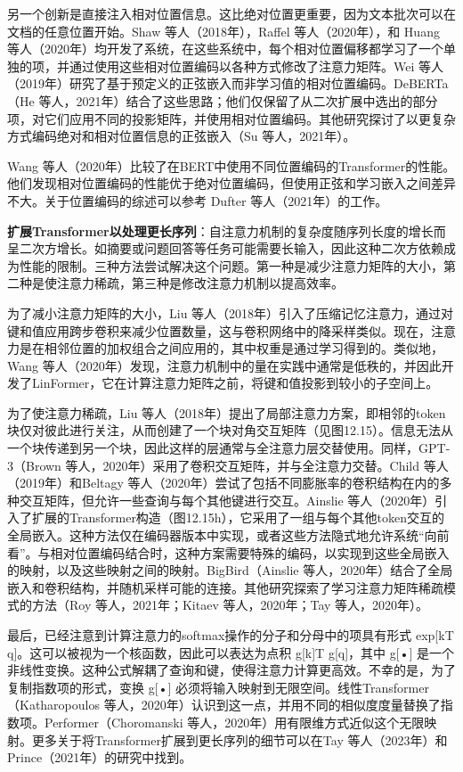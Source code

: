 \documentclass[lang=cn,newtx,10pt,scheme=chinese]{elegantbook}
\begin{document}
另一个创新是直接注入相对位置信息。这比绝对位置更重要，因为文本批次可以在文档的任意位置开始。Shaw 等人（2018年），Raffel 等人（2020年），和 Huang 等人（2020年）均开发了系统，在这些系统中，每个相对位置偏移都学习了一个单独的项，并通过使用这些相对位置编码以各种方式修改了注意力矩阵。Wei 等人（2019年）研究了基于预定义的正弦嵌入而非学习值的相对位置编码。DeBERTa（He 等人，2021年）结合了这些思路；他们仅保留了从二次扩展中选出的部分项，对它们应用不同的投影矩阵，并使用相对位置编码。其他研究探讨了以更复杂方式编码绝对和相对位置信息的正弦嵌入（Su 等人，2021年）。

Wang 等人（2020年）比较了在BERT中使用不同位置编码的Transformer的性能。他们发现相对位置编码的性能优于绝对位置编码，但使用正弦和学习嵌入之间差异不大。关于位置编码的综述可以参考 Dufter 等人（2021年）的工作。

\textbf{扩展Transformer以处理更长序列}：自注意力机制的复杂度随序列长度的增长而呈二次方增长。如摘要或问题回答等任务可能需要长输入，因此这种二次方依赖成为性能的限制。三种方法尝试解决这个问题。第一种是减少注意力矩阵的大小，第二种是使注意力稀疏，第三种是修改注意力机制以提高效率。

为了减小注意力矩阵的大小，Liu 等人（2018年）引入了压缩记忆注意力，通过对键和值应用跨步卷积来减少位置数量，这与卷积网络中的降采样类似。现在，注意力是在相邻位置的加权组合之间应用的，其中权重是通过学习得到的。类似地，Wang 等人（2020年）发现，注意力机制中的量在实践中通常是低秩的，并因此开发了LinFormer，它在计算注意力矩阵之前，将键和值投影到较小的子空间上。

为了使注意力稀疏，Liu 等人（2018年）提出了局部注意力方案，即相邻的token块仅对彼此进行关注，从而创建了一个块对角交互矩阵（见图12.15）。信息无法从一个块传递到另一个块，因此这样的层通常与全注意力层交替使用。同样，GPT-3（Brown 等人，2020年）采用了卷积交互矩阵，并与全注意力交替。Child 等人（2019年）和Beltagy 等人（2020年）尝试了包括不同膨胀率的卷积结构在内的多种交互矩阵，但允许一些查询与每个其他键进行交互。Ainslie 等人（2020年）引入了扩展的Transformer构造（图12.15h），它采用了一组与每个其他token交互的全局嵌入。这种方法仅在编码器版本中实现，或者这些方法隐式地允许系统“向前看”。与相对位置编码结合时，这种方案需要特殊的编码，以实现到这些全局嵌入的映射，以及这些映射之间的映射。BigBird（Ainslie 等人，2020年）结合了全局嵌入和卷积结构，并随机采样可能的连接。其他研究探索了学习注意力矩阵稀疏模式的方法（Roy 等人，2021年；Kitaev 等人，2020年；Tay 等人，2020年）。

最后，已经注意到计算注意力的softmax操作的分子和分母中的项具有形式 exp[kT q]。这可以被视为一个核函数，因此可以表达为点积 g[k]T g[q]，其中 g[•] 是一个非线性变换。这种公式解耦了查询和键，使得注意力计算更高效。不幸的是，为了复制指数项的形式，变换 g[•] 必须将输入映射到无限空间。线性Transformer（Katharopoulos 等人，2020年）认识到这一点，并用不同的相似度度量替换了指数项。Performer（Choromanski 等人，2020年）用有限维方式近似这个无限映射。更多关于将Transformer扩展到更长序列的细节可以在Tay 等人（2023年）和Prince（2021年）的研究中找到。
\end{document}
